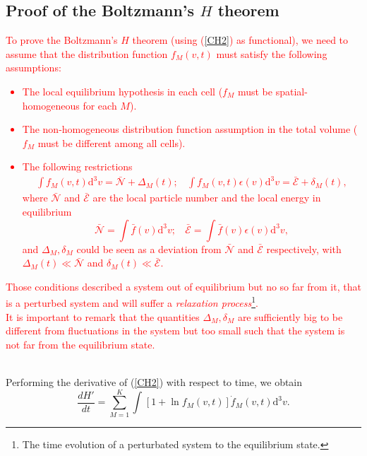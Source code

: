 \documentclass{article}
\begin{document}
\subsection{Proof of the Boltzmann's $H$ theorem}
\textcolor{red}{To prove the Boltzmann's $H$ theorem (using (\ref{CH2}) as functional), we need to assume that the distribution function $f_M(v,t)$ must satisfy the following assumptions:
\begin{itemize}
    \item The local equilibrium hypothesis in each cell ($f_{M}$ must be spatial-homogeneous for each $M$).
    \item The non-homogeneous distribution function assumption in the total volume ($f_{M}$ must be different among all cells).
    \item The following restrictions
    \begin{eqnarray}
        \int f_{M}(v,t) \mathrm{d}^{3}v=\bar{\mathcal{N}}+\Delta_M(t); \ \ \ \ \int f_{M}(v,t) \epsilon(v) \mathrm{d}^{3}v=\bar{\mathcal{E}}+ \delta_M(t), \label{restrictionoutsideclassical}
  \end{eqnarray}
  where $\bar {\mathcal{N}}$ and $\bar{\mathcal{E}}$ are the local particle number and the local energy in equilibrium
  \begin{equation}
      \bar{\mathcal{N}}= \int \bar{f}(v) \mathrm{d}^{3}v ; \ \ \ \ \bar{\mathcal{E}}= \int \bar{f}(v)\epsilon(v) \mathrm{d}^{3}v,
  \end{equation}
  and $\Delta_M,\delta_M$ could be seen as a deviation from $\bar{\mathcal{N}}$ and $\bar{\mathcal{E}}$ respectively, with $\Delta_M(t)\ll \bar{\mathcal{N}}$ and $\delta_M(t) \ll \bar{\mathcal{E}}$.
\end{itemize} 
 Those conditions described a system out of equilibrium but no so far from it, that is a perturbed system and will suffer a \textit{relaxation process}\footnote{The time evolution of a perturbated system to the equilibrium state.}.\\
  It is important to remark that the quantities $\Delta_M,\delta_M$ are sufficiently big to be different from fluctuations in the system but too small such that the system is not far from the equilibrium state.}  \\
Performing the derivative of (\ref{CH2}) with respect to time, we obtain
\begin{equation}
    \frac{dH'}{dt}=\sum_{M=1}^{K}\int_{}^{}\left[ 1+\ln f_M(v,t) \right]\dot f_M(v,t) \mathrm{d}^3v  \label{dH1}.
\end{equation}{}
\end{document}
